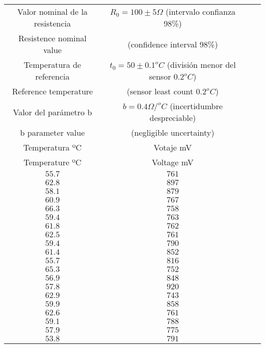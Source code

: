 \begin{table}[h]
\label{tabres}
\centering
\begin{tabular}{cccc}
\hline
Valor nominal de la resistencia  & $R_0=100 \pm 5 \Omega$ (intervalo confianza 98\%)\\
Resistence nominal value&\hspace{2.2cm} (confidence interval 98\%) \\ 
\hline
Temperatura de referencia& $t_0=50\pm 0.1 ^oC$ (división menor del sensor $0.2^oC$) \\
Reference temperature& \hspace{2.2cm}(sensor least count $0.2^oC$)\\
\hline
Valor del parámetro b& $b = 0.4\Omega / ^oC$ (incertidumbre despreciable)\\
b parameter value & \hspace{2.2cm} (negligible uncertainty)\\
\hline
\hline
Temperatura ºC& Votaje mV\\
Temperature ºC& Voltage mV\\
\hline
 $55.7$&$761$\\
\hline 
 $62.8$&$897$\\
\hline 
 $58.1$&$879$\\
\hline 
 $60.9$&$767$\\
\hline 
 $66.3$&$758$\\
\hline 
 $59.4$&$763$\\
\hline 
 $61.8$&$762$\\
\hline 
 $62.5$&$761$\\
\hline 
 $59.4$&$790$\\
\hline 
 $61.4$&$852$\\
\hline 
 $55.7$&$816$\\
\hline 
 $65.3$&$752$\\
\hline 
 $56.9$&$848$\\
\hline 
 $57.8$&$920$\\
\hline 
 $62.9$&$743$\\
\hline 
 $59.9$&$858$\\
\hline 
 $62.6$&$761$\\
\hline 
 $59.1$&$788$\\
\hline 
 $57.9$&$775$\\
\hline
 $53.8$&$791$\\
\hline
\hline
\end{tabular}
\end{table}
